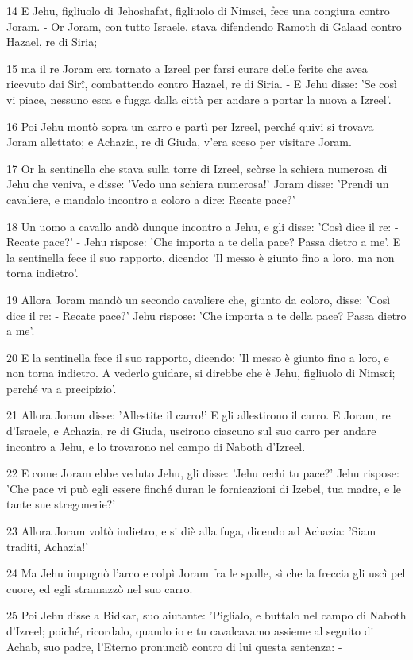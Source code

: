 \par 14 E Jehu, figliuolo di Jehoshafat, figliuolo di Nimsci, fece una congiura contro Joram. - Or Joram, con tutto Israele, stava difendendo Ramoth di Galaad contro Hazael, re di Siria;
\par 15 ma il re Joram era tornato a Izreel per farsi curare delle ferite che avea ricevuto dai Sirî, combattendo contro Hazael, re di Siria. - E Jehu disse: 'Se così vi piace, nessuno esca e fugga dalla città per andare a portar la nuova a Izreel'.
\par 16 Poi Jehu montò sopra un carro e partì per Izreel, perché quivi si trovava Joram allettato; e Achazia, re di Giuda, v'era sceso per visitare Joram.
\par 17 Or la sentinella che stava sulla torre di Izreel, scòrse la schiera numerosa di Jehu che veniva, e disse: 'Vedo una schiera numerosa!' Joram disse: 'Prendi un cavaliere, e mandalo incontro a coloro a dire: Recate pace?'
\par 18 Un uomo a cavallo andò dunque incontro a Jehu, e gli disse: 'Così dice il re: - Recate pace?' - Jehu rispose: 'Che importa a te della pace? Passa dietro a me'. E la sentinella fece il suo rapporto, dicendo: 'Il messo è giunto fino a loro, ma non torna indietro'.
\par 19 Allora Joram mandò un secondo cavaliere che, giunto da coloro, disse: 'Così dice il re: - Recate pace?' Jehu rispose: 'Che importa a te della pace? Passa dietro a me'.
\par 20 E la sentinella fece il suo rapporto, dicendo: 'Il messo è giunto fino a loro, e non torna indietro. A vederlo guidare, si direbbe che è Jehu, figliuolo di Nimsci; perché va a precipizio'.
\par 21 Allora Joram disse: 'Allestite il carro!' E gli allestirono il carro. E Joram, re d'Israele, e Achazia, re di Giuda, uscirono ciascuno sul suo carro per andare incontro a Jehu, e lo trovarono nel campo di Naboth d'Izreel.
\par 22 E come Joram ebbe veduto Jehu, gli disse: 'Jehu rechi tu pace?' Jehu rispose: 'Che pace vi può egli essere finché duran le fornicazioni di Izebel, tua madre, e le tante sue stregonerie?'
\par 23 Allora Joram voltò indietro, e si diè alla fuga, dicendo ad Achazia: 'Siam traditi, Achazia!'
\par 24 Ma Jehu impugnò l'arco e colpì Joram fra le spalle, sì che la freccia gli uscì pel cuore, ed egli stramazzò nel suo carro.
\par 25 Poi Jehu disse a Bidkar, suo aiutante: 'Piglialo, e buttalo nel campo di Naboth d'Izreel; poiché, ricordalo, quando io e tu cavalcavamo assieme al seguito di Achab, suo padre, l'Eterno pronunciò contro di lui questa sentenza: -
